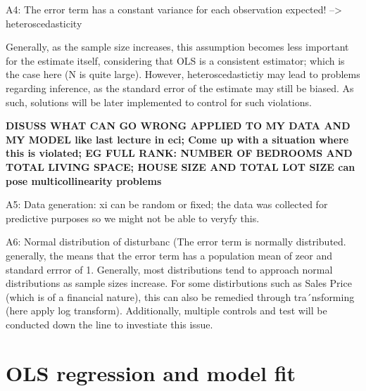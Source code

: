 \documentclass{article}
\begin{document}
A4: The error term has a constant variance for each observation expected! --> heteroscedasticity

Generally, as the sample size increases, this assumption becomes less important for the estimate itself, considering that OLS is a consistent estimator; which is the case here (N is quite large). However, heteroscedastictiy may lead to problems regarding inference, as the standard error of the estimate may still be biased. As such, solutions will be later implemented to control for such violations.

\textbf{DISUSS WHAT CAN GO WRONG APPLIED TO MY DATA AND MY MODEL like last lecture in eci; Come up with a situation where this is violated; EG FULL RANK: NUMBER OF BEDROOMS AND TOTAL LIVING SPACE; HOUSE SIZE AND TOTAL LOT SIZE can pose multicollinearity problems}

A5: Data generation: xi can be random or fixed; the data was collected for predictive purposes so we might not be able to veryfy this.

A6: Normal distribution of disturbanc (The error term is normally distributed. generally, the means that the error term has a population mean of zeor and standard errror of 1. Generally, most distributions tend to approach normal distributions as sample sizes increase. For some distirbutions such as Sales Price (which is of a financial nature), this can also be remedied through tra´nsforming (here apply log transform). Additionally, multiple controls and test will be conducted down the line to investiate this issue.






\section{OLS regression and model fit}
\end{document}

